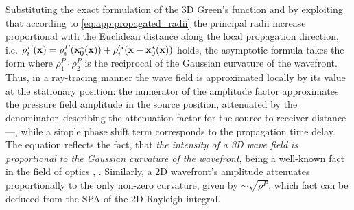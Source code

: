 Substituting the exact formulation of the 3D Green's function %
and by exploiting that according to \eqref{eq:app:propagated_radii} the principal radii increase proportional with the Euclidean distance along the local propagation direction, i.e. $\rho_i^P(\mathbf{x}) = \rho_i^P(\mathbf{x}_0^*(\mathbf{x})) + \rho_i^G(\mathbf{x}-\mathbf{x}_0^*(\mathbf{x}))$ holds, the asymptotic formula takes the form
where $\rho^P_1 \cdot \rho^P_2$ is the reciprocal of the Gaussian curvature of the wavefront.
Thus, in a ray-tracing manner the wave field is approximated locally by its value at the stationary position: 
the numerator of the amplitude factor approximates the pressure field amplitude in the source position, attenuated by the denominator--describing the attenuation factor for the source-to-receiver distance---, while a simple phase shift term corresponds to the propagation time delay.
The equation reflects the fact, that \emph{the intensity of a 3D wave field is proportional to the Gaussian curvature of the wavefront}, being a well-known fact in the field of optics \cite[Sec. 3.1]{Born1970}, \cite[Sec. 1.3]{Bouche1997}.
Similarly, a 2D wavefront's amplitude attenuates proportionally to the only non-zero curvature, given by $\sim \sqrt{\rho^P}$, which fact can be deduced from the SPA of the 2D Rayleigh integral.

